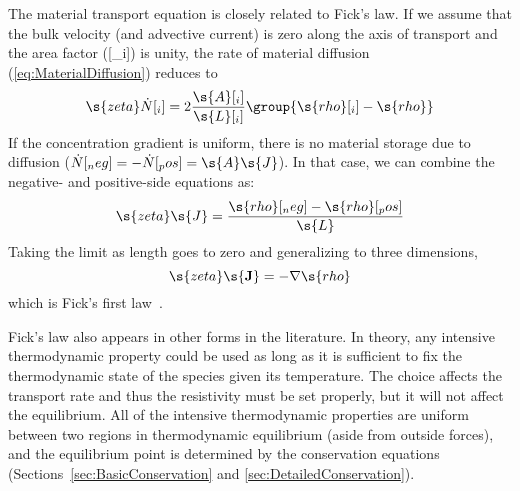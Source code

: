 The material transport equation is closely related to Fick's law\label{mark:FicksLaw}.  If we assume that the bulk velocity (and advective current) is zero along the axis of transport and the area factor ([_i]) is unity, the rate of material diffusion (\autoref{eq:MaterialDiffusion}) reduces to
\begin{equation}
  \s{zeta}\dot{N}[_i] = 2\frac{\s{A}[_i]}{\s{L}[_i]}\group{\s{rho}[_i] - \s{rho}}
\end{equation}
If the concentration gradient is uniform, there is no material storage due to diffusion ($\dot{N}[_neg] = -\dot{N}[_pos] = \s{A}\s{J}$).  In that case, we can combine the negative- and positive-side equations as:
\begin{equation}
  \s{zeta}\s{J} = \frac{\s{rho}[_neg] - \s{rho}[_pos]}{\s{L}}
\end{equation}
Taking the limit as length goes to zero and generalizing to three dimensions,
\begin{equation}
  \s{zeta}\mathbf{\s{J}} = -\mathbf{\nabla}\s{rho}
\end{equation}
which is Fick's first law~\cite{Bird2002, Burghardt2013, Liggett1994, Wesselingh2000, Bockris2000, Taylor1993}.%

Fick's law also appears in other forms in the literature.  In theory, any intensive thermodynamic property could be used as long as it is sufficient to fix the thermodynamic state of the species given its temperature.  The choice affects the transport rate and thus the resistivity must be set properly, but it will not affect the equilibrium.  All of the intensive thermodynamic properties are uniform between two regions in thermodynamic equilibrium (aside from outside forces), and the equilibrium point is determined by the conservation equations (Sections~\ref{sec:BasicConservation} and \ref{sec:DetailedConservation}).

